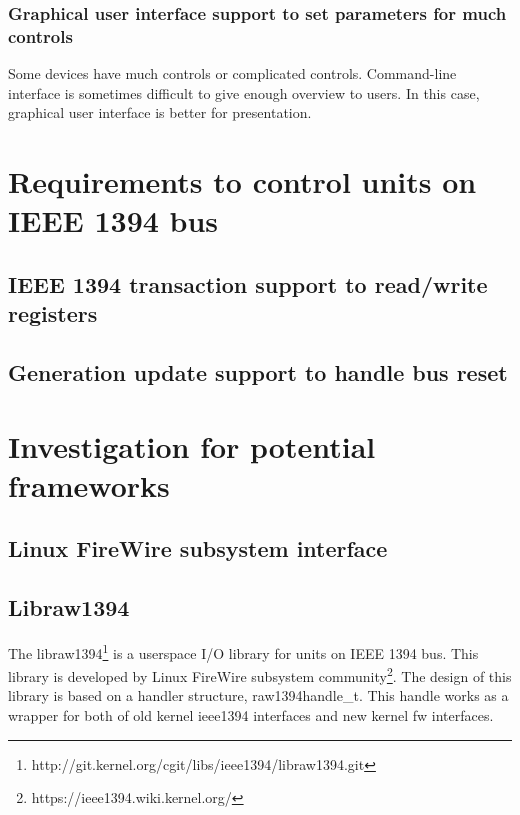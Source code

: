\documentclass[onecolumn]{article}
\begin{document}
\subsubsection{Graphical user interface support to set parameters for much controls}

Some devices have much controls or complicated controls. Command-line interface is sometimes difficult to give enough overview to users. In this case, graphical user interface is better for presentation.


\section{Requirements to control units on IEEE 1394 bus}



\subsection{IEEE 1394 transaction support to read/write registers}


\subsection{Generation update support to handle bus reset}


\section{Investigation for potential frameworks}

\subsection{Linux FireWire subsystem interface}



\subsection{Libraw1394}

The libraw1394\footnote{http://git.kernel.org/cgit/libs/ieee1394/libraw1394.git} is a userspace I/O library for units on IEEE 1394 bus. This library is developed by Linux FireWire subsystem community\footnote{https://ieee1394.wiki.kernel.org/}. The design of this library is based on a handler structure, raw1394handle\_t. This handle works as a wrapper for both of old kernel ieee1394 interfaces and new kernel fw interfaces.
\end{document}
